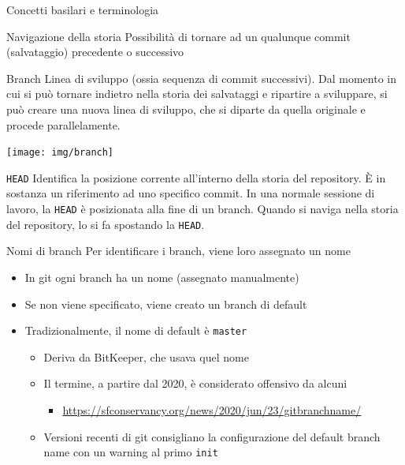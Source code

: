 \documentclass[xcolor=dvipsnames,presentation]{beamer}
\begin{document}
\begin{frame}[allowframebreaks]{Concetti basilari e terminologia}
    \begin{block}{Navigazione della storia}
        Possibilità di tornare ad un qualunque commit (salvataggio) precedente o successivo
    \end{block}
    \begin{block}{Branch}
        Linea di sviluppo (ossia sequenza di commit successivi). Dal momento in cui si può tornare indietro nella storia dei salvataggi e ripartire a sviluppare, si può creare una nuova linea di sviluppo, che si diparte da quella originale e procede parallelamente.
        \begin{center}
            \texttt{[image: img/branch]}
        \end{center}
    \end{block}
    \begin{block}{\texttt{HEAD}}
        Identifica la posizione corrente all'interno della storia del repository.
        È in sostanza un riferimento ad uno specifico commit.
        In una normale sessione di lavoro, la \texttt{HEAD} è posizionata alla fine di un branch.
        Quando si naviga nella storia del repository, lo si fa spostando la \texttt{HEAD}.
    \end{block}
    \begin{block}{Nomi di branch}
        Per identificare i branch, viene loro assegnato un nome
        \begin{itemize}
            \item In git ogni branch ha un nome (assegnato manualmente)
            \item Se non viene specificato, viene creato un branch di default
            \item Tradizionalmente, il nome di default è \texttt{master}
            \begin{itemize}
                \item Deriva da BitKeeper, che usava quel nome
                \item Il termine, a partire dal 2020, è considerato offensivo da alcuni
                \begin{itemize}
                    \item \url{https://sfconservancy.org/news/2020/jun/23/gitbranchname/}
                \end{itemize}
                \item Versioni recenti di git consigliano la configurazione del default branch name con un warning al primo \texttt{init}

\end{itemize}
\end{itemize}
\end{block}
\end{frame}
\end{document}
